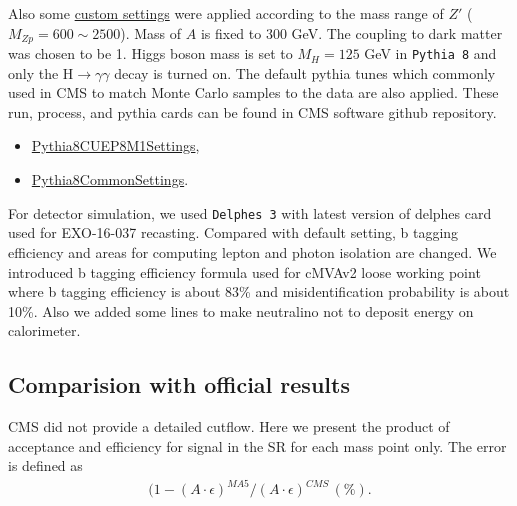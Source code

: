 \documentclass[12pt,A4paper]{article}
\begin{document}
Also some \href{https://github.com/cms-sw/genproductions/blob/mg240/bin/MadGraph5_aMCatNLO/cards/production/13TeV/monoHiggs/Zp2HDM/Zprime_A0h_A0chichi/Zprime_A0h_A0chichi_MZp600_MA0300/Zprime_A0h_A0chichi_MZp600_MA0300_customizecards.dat}{custom settings} were applied according to the mass range of $Z'$ ($M_{Zp} = 600 \sim 2500$). 
Mass of $A$ is fixed to $300$ GeV. The coupling to dark matter was chosen to be 1\cite{ref:dm}. 
Higgs boson mass is set to $M_H = 125$ GeV in \texttt{Pythia 8} and only the H$\rightarrow\gamma\gamma$ decay is turned on.
The default pythia tunes which commonly used in CMS to match Monte Carlo samples to the data are also applied. These run, process, and pythia cards can be found in CMS software github repository\cite{ref:gitgen}.
\begin{itemize}
    \item \href{https://github.com/cms-sw/cmssw/blob/CMSSW_7_1_9_patch/Configuration/Generator/python/Pythia8CUEP8M1Settings_cfi.py}{Pythia8CUEP8M1Settings},
    \item \href{https://github.com/cms-sw/cmssw/blob/CMSSW_7_2_X/Configuration/Generator/python/Pythia8CommonSettings_cfi.py}{Pythia8CommonSettings}.
\end{itemize}


For detector simulation, we used \texttt{Delphes 3}\cite{ref:delphes} with latest version of delphes card used for EXO-16-037 recasting\cite{ref:exo037}. Compared with default setting, b tagging efficiency and areas for computing lepton and photon isolation are changed\cite{ref:beff,ref:photonid}. We introduced b tagging efficiency formula used for cMVAv2 loose working point where b tagging efficiency is about 83\% and misidentification probability is about 10\%. Also we added some lines to make neutralino not to deposit energy on calorimeter. 

\subsection{Comparision with official results}
 CMS did not provide a detailed cutflow. Here we present the product of acceptance and efficiency for signal in the SR for each mass point only. The error is defined as 
\begin{align*}
	(1-(A\cdot\epsilon)^{MA5}/(A\cdot\epsilon)^{CMS} \,(\%).
\end{align*}
\end{document}
